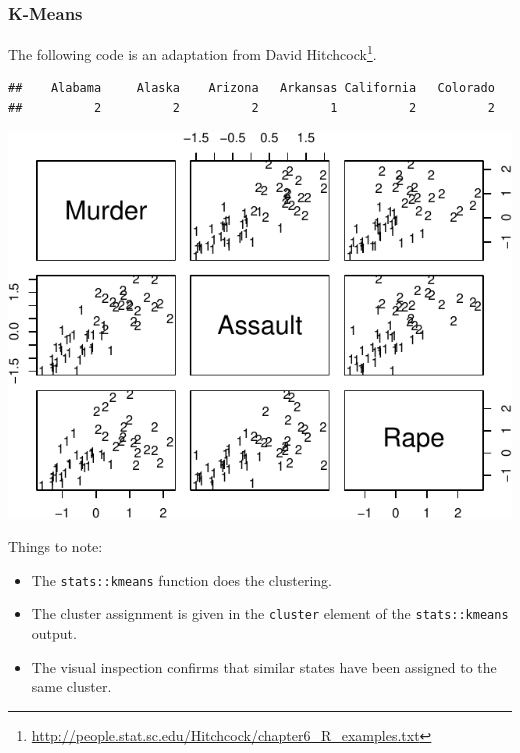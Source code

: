 \documentclass[]{book}
\newenvironment{Shaded}{\begin{snugshade}}{\end{snugshade}}
\newcommand{\CommentTok}[1]{\textcolor[rgb]{0.56,0.35,0.01}{\textit{#1}}}
\newcommand{\ControlFlowTok}[1]{\textcolor[rgb]{0.13,0.29,0.53}{\textbf{#1}}}
\newcommand{\DataTypeTok}[1]{\textcolor[rgb]{0.13,0.29,0.53}{#1}}
\newcommand{\DecValTok}[1]{\textcolor[rgb]{0.00,0.00,0.81}{#1}}
\newcommand{\FloatTok}[1]{\textcolor[rgb]{0.00,0.00,0.81}{#1}}
\newcommand{\KeywordTok}[1]{\textcolor[rgb]{0.13,0.29,0.53}{\textbf{#1}}}
\newcommand{\NormalTok}[1]{#1}
\newcommand{\OperatorTok}[1]{\textcolor[rgb]{0.81,0.36,0.00}{\textbf{#1}}}
\newcommand{\StringTok}[1]{\textcolor[rgb]{0.31,0.60,0.02}{#1}}
\providecommand{\tightlist}{%
  \setlength{\itemsep}{0pt}\setlength{\parskip}{0pt}}
\renewcommand{\href}[2]{#2\footnote{\url{#1}}}
\theoremstyle{definition}
\theoremstyle{definition}
\theoremstyle{definition}
\theoremstyle{remark}
\begin{document}
\hypertarget{k-means-2}{%
\subsubsection{K-Means}\label{k-means-2}}

The following code is an adaptation from \href{http://people.stat.sc.edu/Hitchcock/chapter6_R_examples.txt}{David Hitchcock}.

\begin{Shaded}
\end{Shaded}

\begin{verbatim}
##    Alabama     Alaska    Arizona   Arkansas California   Colorado 
##          2          2          2          1          2          2
\end{verbatim}

\begin{Shaded}
\end{Shaded}

\includegraphics[width=0.5\linewidth]{Rcourse_files/figure-latex/kmeans-1}

Things to note:

\begin{itemize}
\tightlist
\item
  The \texttt{stats::kmeans} function does the clustering.
\item
  The cluster assignment is given in the \texttt{cluster} element of the \texttt{stats::kmeans} output.
\item
  The visual inspection confirms that similar states have been assigned to the same cluster.
\end{itemize}
\end{document}
